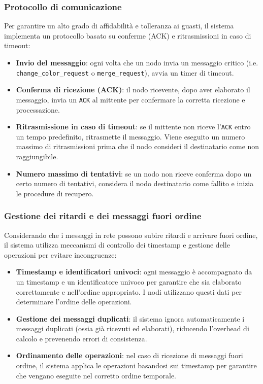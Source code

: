 \documentclass[12pt, a4paper]{report}
\begin{document}
\subsubsection{Protocollo di comunicazione}\label{subsec:ack}

Per garantire un alto grado di affidabilit\`a e tolleranza ai guasti, il sistema implementa un protocollo basato su conferme (ACK) e ritrasmissioni in caso di timeout:

\begin{itemize}
    \item \textbf{Invio del messaggio}: ogni volta che un nodo invia un messaggio critico (i.e. \\\texttt{change\_color\_request} o \texttt{merge\_request}), avvia un timer di timeout.
    \item \textbf{Conferma di ricezione (ACK)}: il nodo ricevente, dopo aver elaborato il messaggio, invia un \texttt{ACK} al mittente per confermare la corretta ricezione e processazione.
    \item \textbf{Ritrasmissione in caso di timeout}: se il mittente non riceve l'\texttt{ACK} entro un tempo predefinito, ritrasmette il messaggio. Viene eseguito un numero massimo di ritrasmissioni prima che il nodo consideri il destinatario come non raggiungibile.
    \item \textbf{Numero massimo di tentativi}: se un nodo non riceve conferma dopo un certo numero di tentativi, considera il nodo destinatario come fallito e inizia le procedure di recupero.
\end{itemize}

\subsubsection{Gestione dei ritardi e dei messaggi fuori ordine}

Considerando che i messaggi in rete possono subire ritardi e arrivare fuori ordine, il sistema utilizza meccanismi di controllo dei timestamp e gestione delle operazioni per evitare incongruenze:

\begin{itemize}
    \item \textbf{Timestamp e identificatori univoci}: ogni messaggio \`e accompagnato da un timestamp e un identificatore univoco per garantire che sia elaborato correttamente e nell'ordine appropriato. I nodi utilizzano questi dati per determinare l'ordine delle operazioni.
    \item \textbf{Gestione dei messaggi duplicati}: il sistema ignora automaticamente i messaggi duplicati (ossia gi\`a ricevuti ed elaborati), riducendo l'overhead di calcolo e prevenendo errori di consistenza.
    \item \textbf{Ordinamento delle operazioni}: nel caso di ricezione di messaggi fuori ordine, il sistema applica le operazioni basandosi sui timestamp per garantire che vengano eseguite nel corretto ordine temporale.
\end{itemize}
\end{document}
